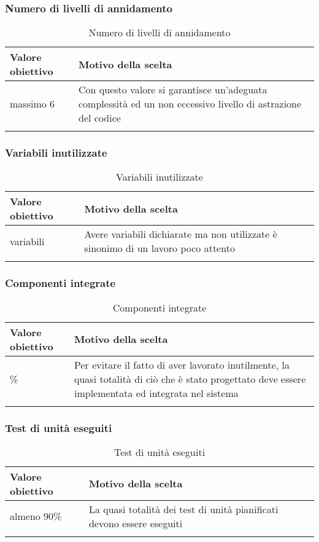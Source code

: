 \documentclass[../PianoDiQualifica_v3.0.0.tex]{subfiles}
\begin{document}
		\subsubsection{Numero di livelli di annidamento}
			\begin{longtable}[c] { >{\centering\arraybackslash}p{4cm} p{7cm} }
				\toprule
				\centerline{\textbf{Valore obiettivo}} & \centerline{\textbf{Motivo della scelta}} \\
				\midrule
					massimo 6 &	Con questo valore si garantisce un'adeguata complessità ed un non eccessivo livello di astrazione del codice \\
				\bottomrule
				\caption{Numero di livelli di annidamento}
			\end{longtable}

		\subsubsection{Variabili inutilizzate}
			\begin{longtable}[c] { >{\centering\arraybackslash}p{4cm} p{7cm} }
				\toprule
				\centerline{\textbf{Valore obiettivo}} & \centerline{\textbf{Motivo della scelta}} \\
				\midrule
					0 variabili &	Avere variabili dichiarate ma non utilizzate è sinonimo di un lavoro poco attento \\
				\bottomrule
				\caption{Variabili inutilizzate}
			\end{longtable}

		\subsubsection{Componenti integrate}
			\begin{longtable}[c] { >{\centering\arraybackslash}p{4cm} p{7cm} }
				\toprule
				\centerline{\textbf{Valore obiettivo}} & \centerline{\textbf{Motivo della scelta}} \\
				\midrule
					90\% &	Per evitare il fatto di aver lavorato inutilmente, la quasi totalità di ciò che è stato progettato deve essere implementata ed integrata nel sistema\\
				\bottomrule
				\caption{Componenti integrate}
			\end{longtable}

		\subsubsection{Test di unità eseguiti}
			\begin{longtable}[c] { >{\centering\arraybackslash}p{4cm} p{7cm} }
				\toprule
				\centerline{\textbf{Valore obiettivo}} & \centerline{\textbf{Motivo della scelta}} \\
				\midrule
					almeno 90\% &	La quasi totalità dei test di unità pianificati devono essere eseguiti \\
				\bottomrule
				\caption{Test di unità eseguiti}
			\end{longtable}
\end{document}
